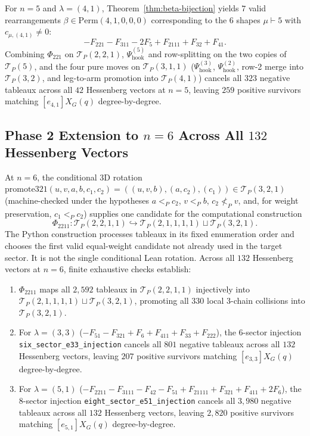 \documentclass[11pt]{article}
\theoremstyle{definition}
\newcommand{\TP}{\mathcal{T}_P}
\begin{document}
For $n=5$ and $\lambda = (4, 1)$, Theorem~\ref{thm:beta-bijection} yields $7$ valid rearrangements $\beta \in \mathrm{Perm}(4,1,0,0,0)$ corresponding to the $6$ shapes $\mu \vdash 5$ with $c_{\mu,(4,1)} \ne 0$:
\[
  -F_{221} - F_{311} - 2F_5 + F_{2111} + F_{32} + F_{41}.
\]
Combining $\Phi_{221}$ on $\TP(2,2,1)$, $\Psi_{\mathrm{hook}}^{(5)}$ and row-splitting on the two copies of $\TP(5)$, and the four pure moves on $\TP(3,1,1)$ ($\Psi_{\mathrm{hook}}^{(3)}$, $\Psi_{\mathrm{hook}}^{(2)}$, row-2 merge into $\TP(3,2)$, and leg-to-arm promotion into $\TP(4,1)$) cancels all $323$ negative tableaux across all $42$ Hessenberg vectors at $n=5$, leaving $259$ positive survivors matching $[e_{4,1}] X_G(q)$ degree-by-degree.

\subsection{Phase 2 Extension to $n = 6$ Across All $132$ Hessenberg Vectors}

At $n = 6$, the conditional $3\mathrm{D}$ rotation $\mathrm{promote321}(u, v, a, b, c_1, c_2) = ((u, v, b), (a, c_2), (c_1)) \in \TP(3, 2, 1)$ (machine-checked under the hypotheses $a<_P c_2$, $v<_P b$, $c_2\not<_P v$, and, for weight preservation, $c_1<_P c_2$) supplies one candidate for the computational construction
\[
  \Phi_{2211} : \TP(2, 2, 1, 1) \hookrightarrow \TP(2, 1, 1, 1, 1) \sqcup \TP(3, 2, 1).
\]
The Python construction processes tableaux in its fixed enumeration order and chooses the first valid equal-weight candidate not already used in the target sector. It is not the single conditional Lean rotation. Across all $132$ Hessenberg vectors at $n = 6$, finite exhaustive checks establish:
\begin{enumerate}
  \item $\Phi_{2211}$ maps all $2{,}592$ tableaux in $\TP(2,2,1,1)$ injectively into $\TP(2,1,1,1,1) \sqcup \TP(3,2,1)$, promoting all $330$ local $3$-chain collisions into $\TP(3,2,1)$.
  \item For $\lambda = (3, 3)$ ($-F_{51} - F_{321} + F_6 + F_{411} + F_{33} + F_{222}$), the $6$-sector injection \nolinkurl{six_sector_e33_injection} cancels all $801$ negative tableaux across all $132$ Hessenberg vectors, leaving $207$ positive survivors matching $[e_{3,3}] X_G(q)$ degree-by-degree.
  \item For $\lambda = (5, 1)$ ($-F_{2211} - F_{3111} - F_{42} - F_{51} + F_{21111} + F_{321} + F_{411} + 2F_6$), the $8$-sector injection \nolinkurl{eight_sector_e51_injection} cancels all $3{,}980$ negative tableaux across all $132$ Hessenberg vectors, leaving $2{,}820$ positive survivors matching $[e_{5,1}] X_G(q)$ degree-by-degree.
\end{enumerate}
\end{document}
